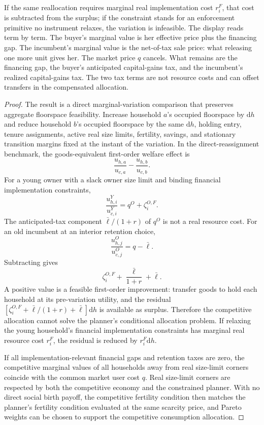 \documentclass[11pt]{article}
\newcommand{\dd}{\mathrm d}
\newcommand{\1}{\mathbf 1}
\begin{document}
If the same reallocation requires marginal real implementation cost $r_i^F$, that cost is subtracted from the surplus; if the constraint stands for an enforcement primitive no instrument relaxes, the variation is infeasible.
The display reads term by term. The buyer's marginal value is her effective price plus the financing gap. The incumbent's marginal value is the net-of-tax sale price: what releasing one more unit gives her. The market price $q$ cancels. What remains are the financing gap, the buyer's anticipated capital-gains tax, and the incumbent's realized capital-gains tax. The two tax terms are not resource costs and can offset transfers in the compensated allocation.

\begin{proof}
The result is a direct marginal-variation comparison that preserves aggregate floorspace feasibility. Increase household $a$'s occupied floorspace by $\dd h$ and reduce household $b$'s occupied floorspace by the same $\dd h$, holding entry, tenure assignments, active real size limits, fertility, savings, and stationary transition margins fixed at the instant of the variation. In the direct-reassignment benchmark, the goods-equivalent first-order welfare effect is
\[
\frac{u_{h,a}}{u_{c,a}}-\frac{u_{h,b}}{u_{c,b}}.
\]
For a young owner with a slack owner size limit and binding financial implementation constraints,
\[
\frac{u^Y_{h,i}}{u^Y_{c,i}}=q^O+\zeta_i^{O,F}.
\]
The anticipated-tax component $\bar\ell/(1+r)$ of $q^O$ is not a real resource cost. For an old incumbent at an interior retention choice,
\[
\frac{u^O_{h,j}}{u^O_{c,j}}=q-\bar\ell.
\]
Subtracting gives
\[
\zeta_i^{O,F}+\frac{\bar\ell}{1+r}+\bar\ell.
\]
A positive value is a feasible first-order improvement: transfer goods to hold each household at its pre-variation utility, and the residual $\left[\zeta_i^{O,F}+\bar\ell/(1+r)+\bar\ell\right]\dd h$ is available as surplus. Therefore the competitive allocation cannot solve the planner's conditional allocation problem. If relaxing the young household's financial implementation constraints has marginal real resource cost $r_i^F$, the residual is reduced by $r_i^F\dd h$.

If all implementation-relevant financial gaps and retention taxes are zero, the competitive marginal values of all households away from real size-limit corners coincide with the common market user cost $q$. Real size-limit corners are respected by both the competitive economy and the constrained planner. With no direct social birth payoff, the competitive fertility condition then matches the planner's fertility condition evaluated at the same scarcity price, and Pareto weights can be chosen to support the competitive consumption allocation.
\end{proof}
\end{document}
